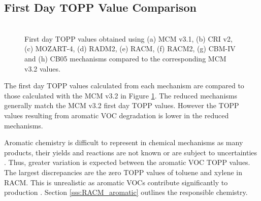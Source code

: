 
\subsection{First Day TOPP Value Comparison} \label{ss:day1} %

\begin{figure}
    \begin{center}
        \includegraphics[width=\textwidth]{img/first_day_values}
    \end{center}
    \caption{First day TOPP values obtained using (a) MCM v3.1, (b) CRI v2, (c) MOZART-4, (d) RADM2, (e) RACM, (f) RACM2, (g) CBM-IV and (h) CB05 mechanisms compared to the corresponding MCM v3.2 values.}
    \label{f:first_day}
\end{figure}

The first day TOPP values calculated from each mechanism are compared to those calculated with the MCM v3.{2} in Figure \ref{f:first_day}. 
The reduced mechanisms generally match the MCM v3.2 first day TOPP values. 
However the TOPP values resulting from aromatic VOC degradation is lower in the reduced mechanisms.

Aromatic chemistry is difficult to represent in chemical mechanisms as many products, their yields and reactions are not known or are subject to uncertainties \citep{Vereecken:2012}. 
Thus, greater variation is expected between the aromatic VOC TOPP values.
The largest discrepancies are the zero TOPP values of toluene and xylene in RACM. 
This is unrealistic as aromatic VOCs contribute significantly to  production \citep{Derwent:1998}. 
Section \ref{sss:RACM_aromatic} outlines the responsible chemistry.

